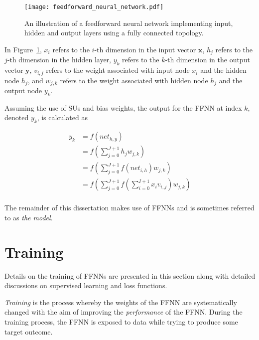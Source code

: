 \begin{figure}[htb]
      \centering
      \texttt{[image: feedforward\_neural\_network.pdf]}
      \caption[A feedforward neural network]{An illustration of a feedforward neural network implementing input, hidden and output layers using a fully connected topology.}
      \label{fig:ffnn}
\end{figure}

In Figure~\ref{fig:ffnn}, $x_i$ refers to the $i$-th dimension in the input vector $\boldsymbol{x}$, $h_j$ refers to the $j$-th dimension in the hidden layer, $y_k$ refers to the $k$-th dimension in the output vector $\boldsymbol{y}$, $v_{i,j}$ refers to the weight associated with input node $x_i$ and the hidden node $h_j$, and $w_{j,k}$ refers to the weight associated with hidden node $h_j$ and the output node $y_k$.

Assuming the use of \acp{SU} and bias weights, the output for the \acs{FFNN} at index $k$, denoted $y_k$, is calculated as

\begin{equation}
      \label{eq:ffnn}
      \begin{split}
            y_k &= f\left(net_{h,y}\right) \\
            &= f\left(\sum_{j=0}^{J+1} h_j w_{j,k}\right) \\
            &= f\left(\sum_{j=0}^{J+1} f\left(net_{i,h}\right) w_{j,k}\right) \\
            &= f\left(\sum_{j=0}^{J+1} f\left(\sum_{i=0}^{I+1} x_i v_{i,j}\right) w_{j,k}\right) \\
      \end{split}
\end{equation}

The remainder of this dissertation makes use of \acp{FFNN} and is sometimes referred to as \textit{the model}.


\section{Training}
\label{sec:anns:training}

Details on the training of \acp{FFNN} are presented in this section along with
detailed discussions on supervised learning and loss functions.

\textit{Training} is the process whereby the weights of the \acs{FFNN} are systematically changed with the aim of improving the \textit{performance} of the \acs{FFNN}. During the training process, the \acs{FFNN} is exposed to data while trying to produce some target outcome.

